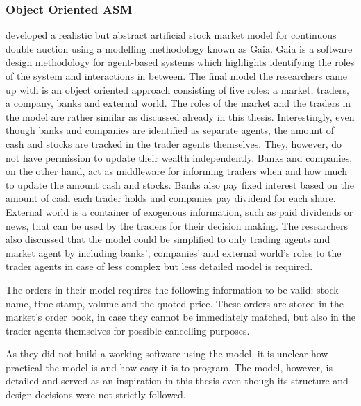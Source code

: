 \subsubsection{Object Oriented ASM}
\citet{Ben12} developed a realistic but abstract artificial stock market
model for continuous double auction using a modelling methodology known as 
Gaia. Gaia is a software design methodology for agent-based systems which 
highlights identifying the roles of the system and interactions in between.
The final model the researchers came up with is an object oriented 
approach consisting of five roles: a market, traders, a company, banks
and external world. The roles of the market and the traders in the model 
are rather similar as discussed already in this thesis. Interestingly,
even though banks and companies are identified as separate agents, 
the amount of cash and stocks are tracked in the trader agents themselves.
They, however, do not have permission to update their wealth independently. 
Banks and companies, on the other hand, act as middleware for informing 
traders when and how much to update the amount cash and stocks. Banks also pay 
fixed interest based on the amount of cash each trader holds and companies 
pay dividend for each share. External world is a container of exogenous 
information, such as paid dividends or news, that can be used by the traders for 
their decision making. The researchers also discussed that the model could be
simplified to only trading agents and market agent by including banks', companies' 
and external world's roles to the trader agents in case of less complex but 
less detailed model is required.

The orders in their model requires the following information to be valid:
stock name, time-stamp, volume and the quoted price. These orders are stored
in the market's order book, in case they cannot be immediately matched, but 
also in the trader agents themselves for possible cancelling purposes.


As they did not build a working software using the model, it is unclear
how practical the model is and how easy it is to program. The model, 
however, is detailed and served as an inspiration in this thesis even though
its structure and design decisions were not strictly followed.


